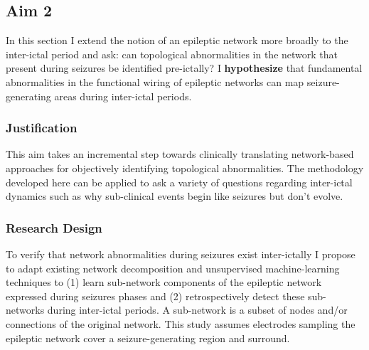\subsection{Aim 2}
\label{rsappr:aim2}
In this section I extend the notion of an epileptic network more broadly to the inter-ictal period and ask: can topological abnormalities in the network that present during seizures be identified pre-ictally? I \textbf{hypothesize} that fundamental abnormalities in the functional wiring of epileptic networks can map seizure-generating areas during inter-ictal periods.

\subsubsection{Justification}
This aim takes an incremental step towards clinically translating network-based approaches for objectively identifying topological abnormalities. The methodology developed here can be applied to ask a variety of questions regarding inter-ictal dynamics such as why sub-clinical events begin like seizures but don't evolve.

\subsubsection{Research Design}
To verify that network abnormalities during seizures exist inter-ictally I propose to adapt existing network decomposition and unsupervised machine-learning techniques to (1) learn sub-network components of the epileptic network expressed during seizures phases and (2) retrospectively detect these sub-networks during inter-ictal periods. A sub-network is a subset of nodes and/or connections of the original network. This study assumes electrodes sampling the epileptic network cover a seizure-generating region and surround.  

